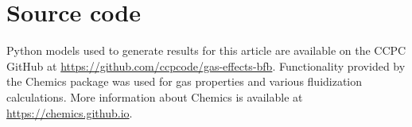 
\section{Source code}

Python models used to generate results for this article are available on the CCPC GitHub at \url{https://github.com/ccpcode/gas-effects-bfb}. Functionality provided by the Chemics package was used for gas properties and various fluidization calculations. More information about Chemics is available at \url{https://chemics.github.io}.
